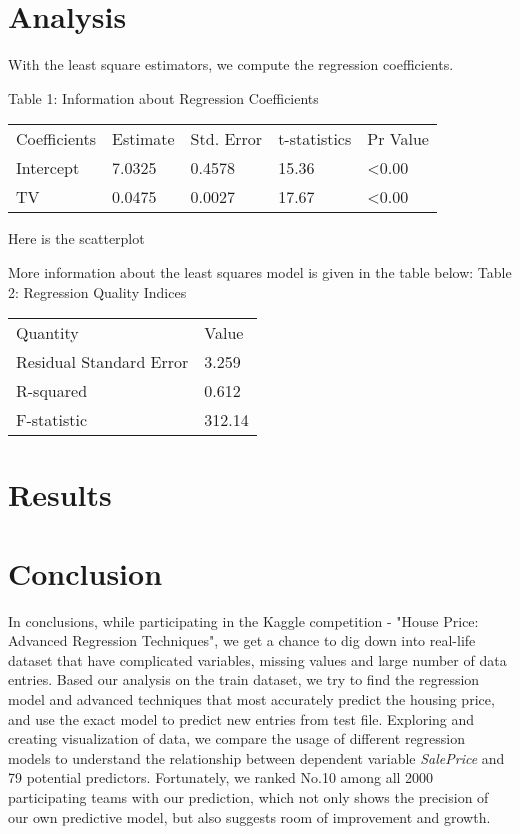 \documentclass[a4paper]{article}
\begin{document}
\begin{flushleft}
\section{Analysis}

With the least square estimators, we compute the regression coefficients.

Table 1: Information about Regression Coefficients

\vspace{2mm}
\begin{tabular}{ | p{3cm} | p{2cm} | p{2cm} | p{2cm} | p{2cm} |}
  \hline			
  Coefficients & Estimate & Std. Error & t-statistics & Pr Value \\
  Intercept & 7.0325 & 0.4578 & 15.36 & <0.00 \\
  TV & 0.0475 & 0.0027 & 17.67 & <0.00 \\
  \hline  
\end{tabular}

\vspace{5mm}
Here is the scatterplot


\vspace{5mm}
More information about the least squares model is given in the table below: \newline
Table 2: Regression Quality Indices

\vspace{2mm}
\begin{tabular}{ | p{4cm} | p{2cm} | }
  \hline			
  Quantity & Value \\
  Residual Standard Error & 3.259 \\
  R-squared & 0.612 \\
  F-statistic & 312.14 \\
  \hline  
\end{tabular}

\section{Results}


\section{Conclusion}

In conclusions, while participating in the Kaggle competition - "House Price: Advanced Regression Techniques", we get a chance to dig down into real-life dataset that have complicated variables, missing values and large number of data entries. Based our analysis on the train dataset, we try to find the regression model and advanced techniques that most accurately predict the housing price, and use the exact model to predict new entries from test file. Exploring and creating visualization of data, we compare the usage of different regression models to understand the relationship between dependent variable \textit{SalePrice} and 79 potential predictors. Fortunately, we ranked No.10 among all 2000 participating teams with our prediction, which not only shows the precision of our own predictive model, but also suggests room of improvement and growth. \newline


\end{flushleft}
\end{document}
